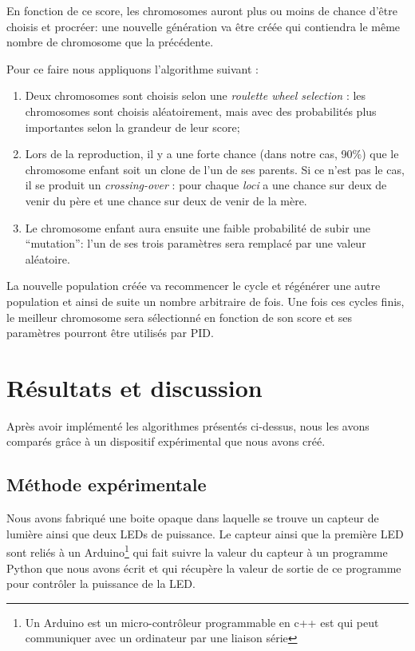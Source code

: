 \documentclass[a4paper,10pt]{report}
\begin{document}
En fonction de ce score, les chromosomes auront plus ou moins de chance d'être choisis et procréer: une nouvelle génération va être créée qui contiendra le même nombre de chromosome que la précédente.

Pour ce faire nous appliquons l'algorithme suivant :
\begin{enumerate}
  \item Deux chromosomes sont choisis selon une \textit{roulette wheel selection} : les chromosomes sont choisis aléatoirement, mais avec des probabilités plus importantes selon la grandeur de leur score;
  \item Lors de la reproduction, il y a une forte chance (dans notre cas, 90\%) que le chromosome enfant soit un clone de l'un de ses parents. Si ce n'est pas le cas, il se produit un \textit{crossing-over} : pour chaque \textit{loci} a une chance sur deux de venir du père et une chance sur deux de venir de la mère.
  \item Le chromosome enfant aura ensuite une faible probabilité de subir une ``mutation'': l'un de ses trois paramètres sera remplacé par une valeur aléatoire.
\end{enumerate}

La nouvelle population créée va recommencer le cycle et régénérer une autre population et ainsi de suite un nombre arbitraire de fois.
Une fois ces cycles finis, le meilleur chromosome sera sélectionné en fonction de son score et ses paramètres pourront être utilisés par PID.


\chapter{Résultats et discussion}
\label{chap:res}

Après avoir implémenté les algorithmes présentés ci-dessus, nous les avons comparés grâce à un dispositif expérimental que nous avons créé.

\section{Méthode expérimentale}
\label{sec:methode}
Nous avons fabriqué une boite opaque dans laquelle se trouve un capteur de lumière ainsi que deux LEDs de puissance. Le capteur ainsi que la première LED sont reliés à un Arduino\footnote{Un Arduino est un micro-contrôleur programmable en c++ est qui peut communiquer avec un ordinateur par une liaison série} qui fait suivre la valeur du capteur à un programme Python que nous avons écrit et qui récupère la valeur de sortie de ce programme pour contrôler la puissance de la LED.
\end{document}
